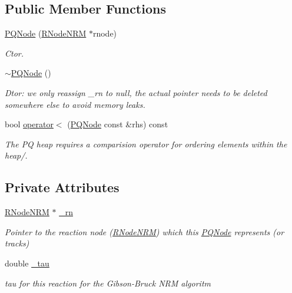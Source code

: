 \subsection*{Public Member Functions}
\begin{DoxyCompactItemize}
\item 
\hyperlink{classchem_1_1PQNode_a216292a150c44b3f2bfeca4518663663}{P\-Q\-Node} (\hyperlink{classchem_1_1RNodeNRM}{R\-Node\-N\-R\-M} $\ast$rnode)
\begin{DoxyCompactList}\small\item\em Ctor. \end{DoxyCompactList}\item 
\hyperlink{classchem_1_1PQNode_a12604503b292d71658be54c9952afcbd}{$\sim$\-P\-Q\-Node} ()
\begin{DoxyCompactList}\small\item\em Dtor\-: we only reassign \-\_\-rn to null, the actual pointer needs to be deleted somewhere else to avoid memory leaks. \end{DoxyCompactList}\item 
bool \hyperlink{classchem_1_1PQNode_a0ba52697bcbc5b2c4accb7dece0aff24}{operator$<$} (\hyperlink{classchem_1_1PQNode}{P\-Q\-Node} const \&rhs) const 
\begin{DoxyCompactList}\small\item\em The P\-Q heap requires a comparision operator for ordering elements within the heap/. \end{DoxyCompactList}\end{DoxyCompactItemize}
\subsection*{Private Attributes}
\begin{DoxyCompactItemize}
\item 
\hyperlink{classchem_1_1RNodeNRM}{R\-Node\-N\-R\-M} $\ast$ \hyperlink{classchem_1_1PQNode_ae0ddd94f908ec800ae02f592e83c630d}{\-\_\-rn}
\begin{DoxyCompactList}\small\item\em Pointer to the reaction node (\hyperlink{classchem_1_1RNodeNRM}{R\-Node\-N\-R\-M}) which this \hyperlink{classchem_1_1PQNode}{P\-Q\-Node} represents (or tracks) \end{DoxyCompactList}\item 
double \hyperlink{classchem_1_1PQNode_a77a83fe486c496c3e4bd4ffa72d8fb57}{\-\_\-tau}
\begin{DoxyCompactList}\small\item\em tau for this reaction for the Gibson-\/\-Bruck N\-R\-M algoritm \end{DoxyCompactList}\end{DoxyCompactItemize}
